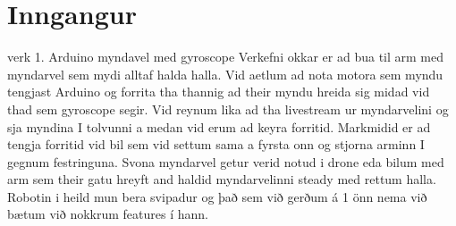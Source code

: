 \section{Inngangur}
verk 1.
Arduino myndavel med gyroscope
Verkefni okkar er ad bua til arm med myndarvel sem mydi alltaf halda halla.  Vid aetlum ad nota motora sem myndu tengjast Arduino og forrita tha thannig ad their myndu hreida sig midad vid thad sem gyroscope segir. Vid reynum lika ad tha livestream ur myndarvelini og sja myndina I tolvunni a medan vid erum ad keyra forritid. Markmidid er ad tengja forritid vid bil sem vid settum sama a fyrsta onn og stjorna arminn I gegnum festringuna. Svona myndarvel getur verid notud i drone eda bilum med arm sem their gatu hreyft and haldid myndarvelinni steady med rettum halla. Robotin i heild mun bera svipadur og það sem við gerðum á 1 önn nema við bætum við nokkrum features í hann. 

